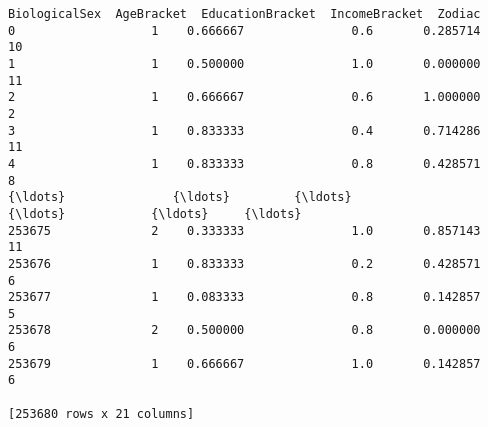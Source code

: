 \documentclass[11pt]{article}
\begin{document}
\begin{Verbatim}[commandchars=\\\{\}]
        BiologicalSex  AgeBracket  EducationBracket  IncomeBracket  Zodiac
0                   1    0.666667               0.6       0.285714      10
1                   1    0.500000               1.0       0.000000      11
2                   1    0.666667               0.6       1.000000       2
3                   1    0.833333               0.4       0.714286      11
4                   1    0.833333               0.8       0.428571       8
{\ldots}               {\ldots}         {\ldots}               {\ldots}            {\ldots}     {\ldots}
253675              2    0.333333               1.0       0.857143      11
253676              1    0.833333               0.2       0.428571       6
253677              1    0.083333               0.8       0.142857       5
253678              2    0.500000               0.8       0.000000       6
253679              1    0.666667               1.0       0.142857       6

[253680 rows x 21 columns]
    \end{Verbatim}
\end{document}
